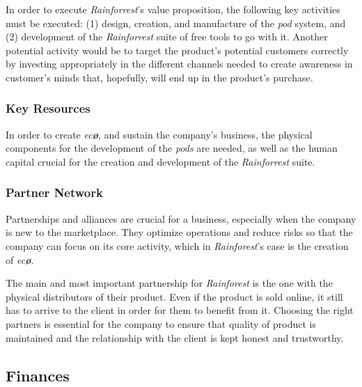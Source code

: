 \documentclass[english,runningheads,a4paper]{llncs}[2018/03/10]
\begin{document}
        In order to execute \textit{Rainforrest}'s value proposition, the
        following key activities must be executed: (1) design, creation, and
        manufacture of the \textit{pod} system, and (2) development of the
        \textit{Rainforrest} suite of free tools to go with it. Another
        potential activity would be to target the product's potential customers
        correctly by investing appropriately in the different channels needed to
        create awareness in customer's minds that, hopefully, will end up in the
        product's purchase.
    

        \subsubsection*{Key Resources}

        In order to create \textit{ec\textbf{\o}}, and sustain the company's
        business, the physical components for the development of the
        \textit{pods} are needed, as well as the human capital crucial for the
        creation and development of the \textit{Rainforrest} suite.


        \subsubsection*{Partner Network}

        Partnerships and alliances are crucial for a business, especially when
        the company is new to the marketplace. They optimize operations and
        reduce risks so that the company can focus on its core activity, which
        in \textit{Rainforest}'s case is the creation of \textit{ec\textbf{\o}}.

        The main and most important partnership for \textit{Rainforest} is the
        one with the physical distributors of their product. Even if the product
        is sold online, it still has to arrive to the client in order for them
        to benefit from it. Choosing the right partners is essential for the
        company to ensure that quality of product is maintained and the
        relationship with the client is kept honest and trustworthy.


    \subsection*{Finances}
\end{document}
